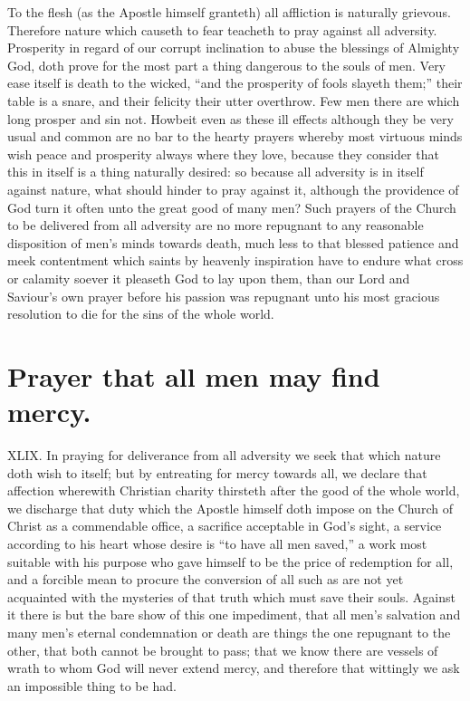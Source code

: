 To the flesh (as the Apostle himself granteth) all affliction is naturally grievous. Therefore nature which causeth to fear teacheth to pray against all adversity. Prosperity in regard of our corrupt inclination to abuse the blessings of Almighty God, doth prove for the most part a thing dangerous to the souls of men. Very ease itself is death to the wicked, “and the prosperity of fools slayeth them;” their table is a snare, and their felicity their utter overthrow. Few men there are which long prosper and sin not. Howbeit even as these ill effects although they be very usual and common are no bar to the hearty prayers whereby most virtuous minds wish peace and prosperity always where they love, because they consider that this in itself is a thing naturally desired: so because all adversity is in itself against nature, what should hinder to pray against it, although the providence of God turn it often unto the great good of many men? Such prayers of the Church to be delivered from all adversity are no more repugnant to any reasonable disposition of men’s minds towards death, much less to that blessed patience and meek contentment which saints by heavenly inspiration have to endure what cross or calamity soever it pleaseth God to lay upon them, than our Lord and Saviour’s own prayer before his passion was repugnant unto his most gracious resolution to die for the sins of the whole world.


\section*{Prayer that all men may find mercy.}
XLIX. In praying for deliverance from all adversity we seek that which nature doth wish to itself; but by entreating for mercy towards all, we declare that affection wherewith Christian charity thirsteth after the good of the whole world, we discharge that duty which the Apostle himself doth impose on the Church of Christ as a commendable office, a sacrifice acceptable in God’s sight, a service according to his heart whose desire is “to have all men saved,” a work most suitable with his purpose who gave himself to be the price of  redemption for all,
 and a forcible mean to procure the conversion of all such as are not yet acquainted with the mysteries of that truth which must save their souls. Against it there is but the bare show of this one impediment, that all men’s salvation and many men’s eternal condemnation or death are things the one repugnant to the other, that both cannot be brought to pass; that we know there are vessels of wrath to whom God will never extend mercy, and therefore that wittingly we ask an impossible thing to be had.

